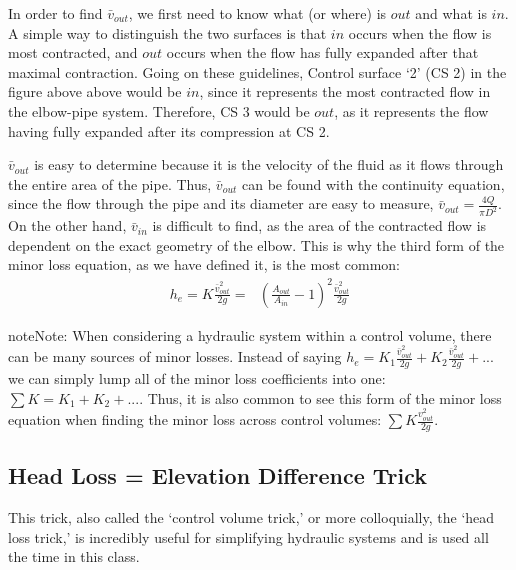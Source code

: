\documentclass[letterpaper,10pt,english]{sphinxmanual}
\begin{document}
In order to find \(\bar v_{out}\), we first need to know what (or where) is \(out\) and what is \(in\). A simple way to distinguish the two surfaces is that \(in\) occurs when the flow is most contracted, and \(out\) occurs when the flow has fully expanded after that maximal contraction. Going on these guidelines, Control surface ‘2’ (CS 2) in the figure above above would be \(in\), since it represents the most contracted flow in the elbow-pipe system. Therefore, CS 3 would be \(out\), as it represents the flow having fully expanded after its compression at CS 2.

\(\bar v_{out}\) is easy to determine because it is the velocity of the fluid as it flows through the entire area of the pipe. Thus, \(\bar v_{out}\) can be found with the continuity equation, since the flow through the pipe and its diameter are easy to measure, \(\bar v_{out} = \frac{4 Q}{\pi D^2}\). On the other hand, \(\bar v_{in}\) is difficult to find, as the area of the contracted flow is dependent on the exact geometry of the elbow. This is why the third form of the minor loss equation, as we have defined it, is the most common:
\begin{equation}\label{equation:Review/Review_Fluid_Mechanics:Review/Review_Fluid_Mechanics:14}
\begin{split}h_e = K \frac{\bar v_{out}^2}{2g} = \,\,\,\, \left( \frac{A_{out}}{A_{in}} -1 \right)^2 \frac{\bar v_{out}^2}{2g}\end{split}
\end{equation}
\begin{sphinxadmonition}{note}{Note:}
When considering a hydraulic system within a control volume, there can be many sources of minor losses. Instead of saying \(h_e = K_1 \frac{\bar v_{out}^2}{2g} + K_2 \frac{\bar v_{out}^2}{2g} + ...\) we can simply lump all of the minor loss coefficients into one: \(\sum K = K_1 + K_2 + ...\). Thus, it is also common to see this form of the minor loss equation when finding the minor loss across control volumes: \(\sum K \frac{v_{out}^2}{2g}\).
\end{sphinxadmonition}


\subsection{Head Loss = Elevation Difference Trick}
\label{\detokenize{Review/Review_Fluid_Mechanics:head-loss-elevation-difference-trick}}\label{\detokenize{Review/Review_Fluid_Mechanics:heading-head-loss-elevation-difference-trick}}
This trick, also called the ‘control volume trick,’ or more colloquially, the ‘head loss trick,’ is incredibly useful for simplifying hydraulic systems and is used all the time in this class.
\end{document}
